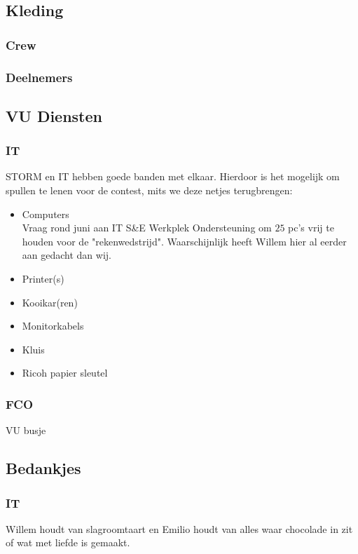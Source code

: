 	\subsection{Kleding}
		\subsubsection{Crew}
		
		\subsubsection{Deelnemers}
		
	\subsection{VU Diensten}
		\subsubsection{IT}
		STORM en IT hebben goede banden met elkaar. Hierdoor is het mogelijk om spullen te lenen voor de contest, mits we deze netjes terugbrengen:
		\begin{itemize}
		\item Computers\label{pcs}\\
		Vraag rond juni aan IT S\&E Werkplek Ondersteuning om $25$ pc's vrij te houden voor de "rekenwedstrijd". Waarschijnlijk heeft Willem hier al eerder aan gedacht dan wij.
		\item Printer(s)
		\item Kooikar(ren)
		\item Monitorkabels
		\item Kluis
		\item Ricoh papier sleutel
		\end{itemize}
		
		\subsubsection{FCO}
		VU busje
			
	\subsection{Bedankjes}
		\subsubsection{IT}
		Willem houdt van slagroomtaart en Emilio houdt van alles waar chocolade in zit of wat met liefde is gemaakt.
		
